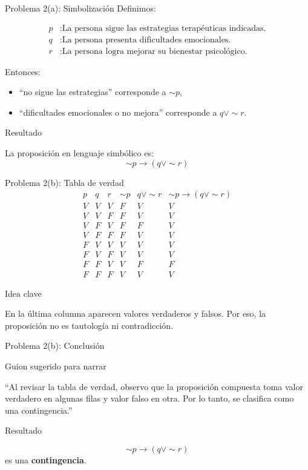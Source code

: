 \documentclass[aspectratio=169,10pt]{beamer}
\newcommand{\IdeaClave}[1]{
	\begin{alertblock}{Idea clave}
		#1
	\end{alertblock}
}
\newcommand{\Guion}[1]{
	\begin{exampleblock}{Guion sugerido para narrar}
		#1
	\end{exampleblock}
}
\newcommand{\Resultado}[1]{
	\begin{block}{Resultado}
		#1
	\end{block}
}
\begin{document}
	\begin{frame}{Problema 2(a): Simbolización}
		Definimos:
		
		\begin{align*}
			p &: \text{La persona sigue las estrategias terapéuticas indicadas.} \\
			q &: \text{La persona presenta dificultades emocionales.} \\
			r &: \text{La persona logra mejorar su bienestar psicológico.}
		\end{align*}
		
		Entonces:
		\begin{itemize}
			\item ``no sigue las estrategias'' corresponde a \(\sim p\),
			\item ``dificultades emocionales o no mejora'' corresponde a \(q\lor \sim r\).
		\end{itemize}
		
		\Resultado{
			La proposición en lenguaje simbólico es:
			\[
			\sim p \to (q\lor \sim r)
			\]
		}
	\end{frame}
	
	\begin{frame}{Problema 2(b): Tabla de verdad}
		\small
		\[
		\begin{array}{c|c|c|c|c|c}
			p & q & r & \sim p & q\lor \sim r & \sim p \to (q\lor \sim r)\\
			\hline
			V & V & V & F & V & V\\
			V & V & F & F & V & V\\
			V & F & V & F & F & V\\
			V & F & F & F & V & V\\
			F & V & V & V & V & V\\
			F & V & F & V & V & V\\
			F & F & V & V & F & F\\
			F & F & F & V & V & V
		\end{array}
		\]
		\normalsize
		
		\IdeaClave{
			En la última columna aparecen valores verdaderos y falsos. Por eso, la proposición no es tautología ni contradicción.
		}
	\end{frame}
	
	\begin{frame}{Problema 2(b): Conclusión}
		\Guion{
			``Al revisar la tabla de verdad, observo que la proposición compuesta toma valor verdadero en algunas filas y valor falso en otra. Por lo tanto, se clasifica como una contingencia.''}
		
		\Resultado{
			\[
			\sim p \to (q\lor \sim r)
			\]
			es una \textbf{contingencia}.
		}
	\end{frame}
	
\end{document}
